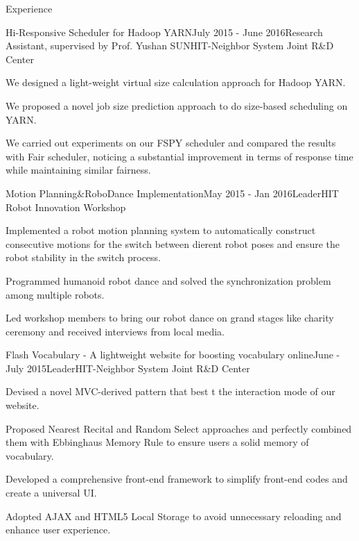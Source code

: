 \documentclass{resume} %
\begin{document}
\begin{rSection}{Experience}

\begin{rSubsection}{Hi-Responsive Scheduler for Hadoop YARN}{July 2015 - June 2016}{Research Assistant, supervised by Prof. Yushan SUN}{HIT-Neighbor System Joint R\&D Center}
\item We designed a light-weight virtual size calculation approach for Hadoop YARN.
\item We proposed a novel job size prediction approach to do size-based scheduling on YARN.
\item We carried out experiments on our FSPY scheduler and compared the results with Fair scheduler, noticing a
substantial improvement in terms of response time while maintaining similar fairness.
\end{rSubsection}



\begin{rSubsection}{Motion Planning\&RoboDance Implementation}{May 2015 - Jan 2016}{Leader}{HIT Robot Innovation Workshop}
\item Implemented a robot motion planning system to automatically construct consecutive motions for the switch
between dierent robot poses and ensure the robot stability in the switch process.
\item Programmed humanoid robot dance and solved the synchronization problem among multiple robots.
\item Led workshop members to bring our robot dance on grand stages like charity ceremony and received interviews
from local media.
\end{rSubsection}


\begin{rSubsection}{Flash Vocabulary - A lightweight website for boosting vocabulary online}{June - July 2015}{Leader}{HIT-Neighbor System Joint R\&D Center}
\item Devised a novel MVC-derived pattern that best t the interaction mode of our website.
\item Proposed Nearest Recital and Random Select approaches and perfectly combined them with Ebbinghaus Memory Rule to ensure users a solid memory of vocabulary.
\item Developed a comprehensive front-end framework to simplify front-end codes and create a universal UI.
\item Adopted AJAX and HTML5 Local Storage to avoid unnecessary reloading and enhance user experience.
\end{rSubsection}


\end{rSection}
\end{document}
